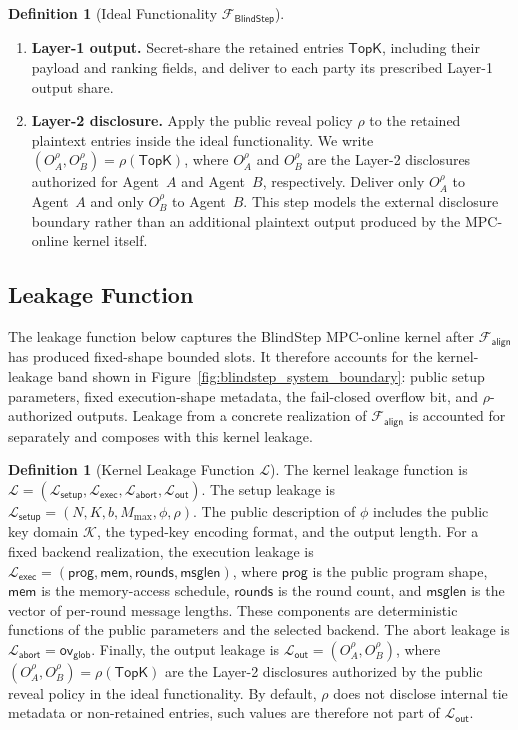 \documentclass[conference,compsoc,letterpaper]{IEEEtran}
\theoremstyle{definition}
\newtheorem{definition}[theorem]{Definition}
\theoremstyle{remark}
\newcommand{\BlindStep}{BlindStep\xspace}
\newcommand{\FBlindStep}{\mathcal{F}_{\textsf{BlindStep}}}
\newcommand{\Leak}{\mathcal{L}}
\newcommand{\LeakSetup}{\Leak_{\mathsf{setup}}}
\newcommand{\LeakExec}{\Leak_{\mathsf{exec}}}
\newcommand{\LeakOut}{\Leak_{\mathsf{out}}}
\newcommand{\LeakAbort}{\Leak_{\mathsf{abort}}}
\newcommand{\Falign}{\mathcal{F}_{\mathsf{align}}}
\newcommand{\Mmax}{M_{\max}}
\newcommand{\compat}{\phi}
\newcommand{\policy}{\rho}
\newcommand{\scorebits}{b}
\newcommand{\globaloverflow}{\mathsf{ov}_{\mathsf{glob}}}
\begin{document}
\begin{definition}[Ideal Functionality $\FBlindStep$]
\begin{enumerate}[label=(\arabic*), leftmargin=*, nosep]
    \item \textbf{Layer-1 output.}
    Secret-share the retained entries $\mathsf{TopK}$, including their payload and ranking fields, and deliver to each party its prescribed Layer-1 output share.

    \item \textbf{Layer-2 disclosure.}
    Apply the public reveal policy $\policy$ to the retained plaintext entries inside the ideal functionality.
    We write $(O_A^\policy,O_B^\policy)=\policy(\mathsf{TopK})$, where $O_A^\policy$ and $O_B^\policy$ are the Layer-2 disclosures authorized for Agent~$A$ and Agent~$B$, respectively.
    Deliver only $O_A^\policy$ to Agent~$A$ and only $O_B^\policy$ to Agent~$B$.
    This step models the external disclosure boundary rather than an additional plaintext output produced by the MPC-online kernel itself.
\end{enumerate}
\end{definition}

\subsection{Leakage Function}
\label{subsec:leakage}

The leakage function below captures the \BlindStep{} MPC-online kernel after $\Falign{}$ has produced fixed-shape bounded slots.
It therefore accounts for the kernel-leakage band shown in Figure~\ref{fig:blindstep_system_boundary}: public setup parameters, fixed execution-shape metadata, the fail-closed overflow bit, and $\policy$-authorized outputs.
Leakage from a concrete realization of $\Falign{}$ is accounted for separately and composes with this kernel leakage.

\begin{definition}[Kernel Leakage Function $\Leak$]
\label{def:leakage}
The kernel leakage function is $\Leak=(\LeakSetup,\LeakExec,\LeakAbort,\LeakOut)$.
The setup leakage is $\LeakSetup=(N,K,\scorebits,\Mmax,\compat,\policy)$.
The public description of $\compat$ includes the public key domain $\mathcal K$, the typed-key encoding format, and the output length.
For a fixed backend realization, the execution leakage is $\LeakExec=(\mathsf{prog},\mathsf{mem},\mathsf{rounds},\mathsf{msglen})$, where $\mathsf{prog}$ is the public program shape, $\mathsf{mem}$ is the memory-access schedule, $\mathsf{rounds}$ is the round count, and $\mathsf{msglen}$ is the vector of per-round message lengths.
These components are deterministic functions of the public parameters and the selected backend.
The abort leakage is $\LeakAbort=\globaloverflow$.
Finally, the output leakage is $\LeakOut=(O_A^\policy,O_B^\policy)$, where $(O_A^\policy,O_B^\policy)=\policy(\mathsf{TopK})$ are the Layer-2 disclosures authorized by the public reveal policy in the ideal functionality.
By default, $\policy$ does not disclose internal tie metadata or non-retained entries, such values are therefore not part of $\LeakOut$.
\end{definition}
\end{document}
